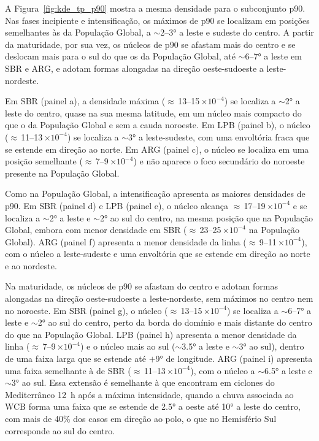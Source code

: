 A Figura~\ref{fig:kde_tp_p90} mostra a mesma densidade para o subconjunto p90. Nas fases incipiente e intensificação, os máximos de p90 se localizam em posições semelhantes às da População Global, a ${\sim}$2--3° a leste e sudeste do centro. A partir da maturidade, por sua vez, os núcleos de p90 se afastam mais do centro e se deslocam mais para o sul do que os da População Global, até ${\sim}$6--7° a leste em SBR e ARG, e adotam formas alongadas na direção oeste-sudoeste a leste-nordeste.

Em SBR (painel a), a densidade máxima (${\approx}$\,13--15\,$\times10^{-4}$) se localiza a ${\sim}$2° a leste do centro, quase na sua mesma latitude, em um núcleo mais compacto do que o da População Global e sem a cauda noroeste. Em LPB (painel b), o núcleo (${\approx}$\,11--13\,$\times10^{-4}$) se localiza a ${\sim}$3° a leste-sudeste, com uma envoltória fraca que se estende em direção ao norte. Em ARG (painel c), o núcleo se localiza em uma posição semelhante (${\approx}$\,7--9\,$\times10^{-4}$) e não aparece o foco secundário do noroeste presente na População Global.

Como na População Global, a intensificação apresenta as maiores densidades de p90. Em SBR (painel d) e LPB (painel e), o núcleo alcança ${\approx}$\,17--19\,$\times10^{-4}$ e se localiza a ${\sim}$2° a leste e ${\sim}$2° ao sul do centro, na mesma posição que na População Global, embora com menor densidade em SBR (${\approx}$\,23--25\,$\times10^{-4}$ na População Global). ARG (painel f) apresenta a menor densidade da linha (${\approx}$\,9--11\,$\times10^{-4}$), com o núcleo a leste-sudeste e uma envoltória que se estende em direção ao norte e ao nordeste.

Na maturidade, os núcleos de p90 se afastam do centro e adotam formas alongadas na direção oeste-sudoeste a leste-nordeste, sem máximos no centro nem no noroeste. Em SBR (painel g), o núcleo (${\approx}$\,13--15\,$\times10^{-4}$) se localiza a ${\sim}$6--7° a leste e ${\sim}$2° ao sul do centro, perto da borda do domínio e mais distante do centro do que na População Global. LPB (painel h) apresenta a menor densidade da linha (${\approx}$\,7--9\,$\times10^{-4}$) e o núcleo mais ao sul (${\sim}$3.5° a leste e ${\sim}$3° ao sul), dentro de uma faixa larga que se estende até $+$9° de longitude. ARG (painel i) apresenta uma faixa semelhante à de SBR (${\approx}$\,11--13\,$\times10^{-4}$), com o núcleo a ${\sim}$6.5° a leste e ${\sim}$3° ao sul. Essa extensão é semelhante à que \citet{flaounas2018heavy} encontram em ciclones do Mediterrâneo 12~h após a máxima intensidade, quando a chuva associada ao WCB forma uma faixa que se estende de 2.5° a oeste até 10° a leste do centro, com mais de 40\% dos casos em direção ao polo, o que no Hemisfério Sul corresponde ao sul do centro.

